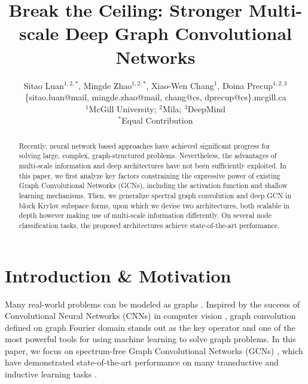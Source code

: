 \documentclass{article}
\title{Break the Ceiling: Stronger Multi-scale Deep Graph Convolutional Networks}
\author{
Sitao Luan$^{1,2,*}$, Mingde Zhao$^{1,2,*}$, Xiao-Wen Chang$^{1}$, Doina Precup$^{1,2,3}$\\
\{sitao.luan@mail, mingde.zhao@mail, chang@cs, dprecup@cs\}.mcgill.ca\\
$^1$McGill University; $^2$Mila; $^3$DeepMind\\
$^{*}$Equal Contribution
}
\begin{document}
\maketitle	

\begin{abstract}
Recently, neural network based approaches have achieved significant progress for solving large, complex, graph-structured problems. Nevertheless, the advantages of multi-scale information and deep architectures have not been sufficiently exploited. In this paper, we first analyze key factors constraining the expressive power of existing Graph Convolutional Networks (GCNs), including the activation function and shallow learning mechanisms. Then, we generalize spectral graph convolution and deep GCN in block Krylov subspace forms, upon which we devise two architectures, both scalable in depth however making use of multi-scale information differently. On several node classification tasks, the proposed architectures achieve state-of-the-art performance.
\end{abstract}
	
\section{Introduction \& Motivation}
\label{sec:introduction}
Many real-world problems can be modeled as graphs \cite{hamilton2017inductive, kipf2016classification, liao2019lanczos, gilmer2017neural, monti2017geometric, defferrard2016fast}. Inspired by the success of Convolutional Neural Networks (CNNs) \cite{lecun1998gradient} in computer vision \cite{li2018adaptive}, graph convolution defined on graph Fourier domain stands out as the key operator and one of the most powerful tools for using machine learning to solve graph problems. In this paper, we focus on spectrum-free Graph Convolutional Networks (GCNs) \cite{bronstein2016geometric, shuman2012emerging}, which have demonstrated state-of-the-art performance on many transductive and inductive learning tasks \cite{defferrard2016fast, kipf2016classification, liao2019lanczos, chen2018fastgcn, chen2017stochastic}.
\end{document}
